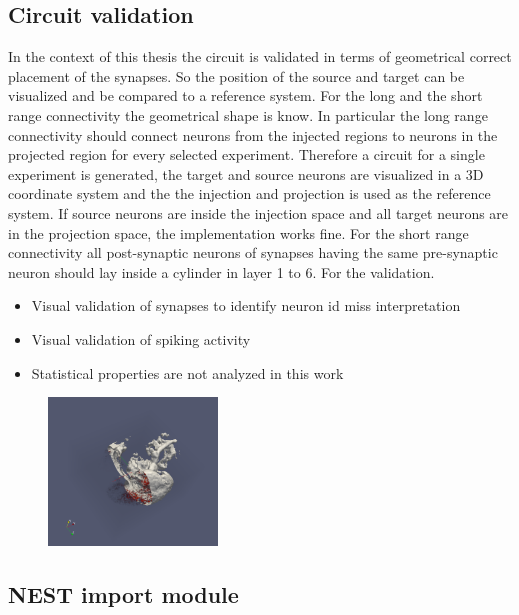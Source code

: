 \documentclass[a4paper]{article}
\begin{document}
\subsection{Circuit validation}

In the context of this thesis the circuit is validated in terms of geometrical correct placement of
the synapses. So the position of the source and target can be visualized and be compared to a 
reference system. For the long and the short range connectivity the geometrical shape is know.
In particular the long range connectivity should connect neurons from the injected regions to neurons
in the projected region for every selected experiment. Therefore a circuit for a single experiment is 
generated, the target and source neurons are visualized in a 3D coordinate system and the the injection
and projection is used as the reference system. If source neurons are inside the injection space and all
target neurons are in the projection space, the implementation works fine.
For the short range connectivity all post-synaptic neurons of synapses having the same pre-synaptic neuron should
lay inside a cylinder in layer 1 to 6. For the validation. 
 
\begin{itemize}
      \item Visual validation of synapses to identify neuron id miss interpretation
      \item Visual validation of spiking activity
      \item Statistical properties are not analyzed in this work 
\end{itemize}

\begin{figure}[ht!]
\centering
\includegraphics[width=0.4\textwidth]{paraview_ex.png}
\end{figure}

\subsection{NEST import module}
\end{document}

